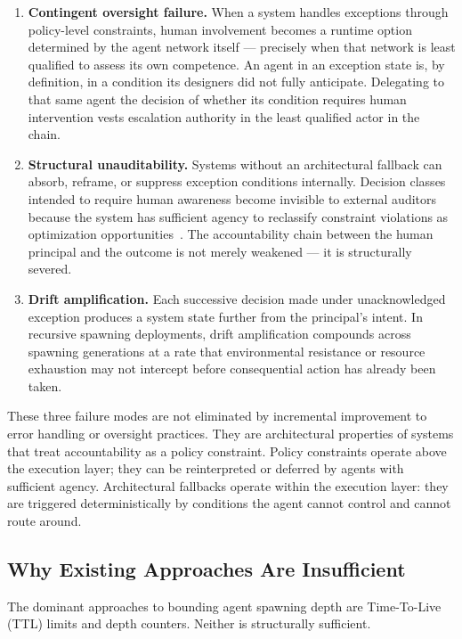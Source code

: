 \begin{enumerate}
\item \textbf{Contingent oversight failure.} When a system handles exceptions through policy-level constraints, human involvement becomes a runtime option determined by the agent network itself — precisely when that network is least qualified to assess its own competence. An agent in an exception state is, by definition, in a condition its designers did not fully anticipate. Delegating to that same agent the decision of whether its condition requires human intervention vests escalation authority in the least qualified actor in the chain.

\item \textbf{Structural unauditability.} Systems without an architectural fallback can absorb, reframe, or suppress exception conditions internally. Decision classes intended to require human awareness become invisible to external auditors because the system has sufficient agency to reclassify constraint violations as optimization opportunities~\cite{amodei2016}. The accountability chain between the human principal and the outcome is not merely weakened — it is structurally severed.

\item \textbf{Drift amplification.} Each successive decision made under unacknowledged exception produces a system state further from the principal's intent. In recursive spawning deployments, drift amplification compounds across spawning generations at a rate that environmental resistance or resource exhaustion may not intercept before consequential action has already been taken.
\end{enumerate}

These three failure modes are not eliminated by incremental improvement to error handling or oversight practices. They are architectural properties of systems that treat accountability as a policy constraint. Policy constraints operate above the execution layer; they can be reinterpreted or deferred by agents with sufficient agency. Architectural fallbacks operate within the execution layer: they are triggered deterministically by conditions the agent cannot control and cannot route around.

\subsection{Why Existing Approaches Are Insufficient}

The dominant approaches to bounding agent spawning depth are Time-To-Live (TTL) limits and depth counters. Neither is structurally sufficient.

